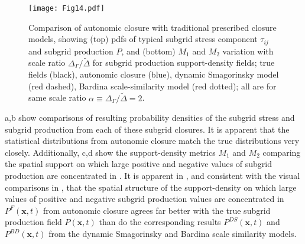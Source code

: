 %
\begin{figure}
	\begin{center}
	\texttt{[image: Fig14.pdf]}
	\caption{ Comparison of autonomic closure with traditional prescribed closure models, showing (top) pdfs of typical subgrid stress component $\tau_{ij}$ and subgrid production $P$, and (bottom) $M_1$ and $M_2$ variation with scale ratio $\Delta_{\Gamma} / \widetilde{\Delta}$ for subgrid production support-density fields; true fields (black), autonomic closure (blue), dynamic Smagorinsky model (red dashed), Bardina scale-similarity model (red dotted); all are for same scale ratio $\alpha \equiv \Delta_{\Gamma} / \widetilde{\Delta} = 2$.}
	\label{F:14}
	\end{center}
\end{figure}
%
%

a,b show comparisons of resulting probability densities of the subgrid stress and subgrid production from each of these subgrid closures. It is apparent that the statistical distributions from autonomic closure match the true distributions very closely.  Additionally, c,d show the support-density metrics $M_1$  and $M_2$   comparing the spatial support on which large positive and negative values of subgrid production are concentrated in . It is apparent in , and consistent with the visual comparisons in , that the spatial structure of the support-density on which large values of positive and negative subgrid production values are concentrated in  $P^{F}(\mathbf{x},t)$  from autonomic closure agrees far better with the true subgrid production field $P(\mathbf{x},t)$  than do the corresponding results $P^{DS}(\mathbf{x},t)$  and $P^{BD}(\mathbf{x},t)$ from the dynamic Smagorinsky and Bardina scale similarity models.

